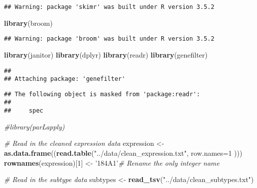 \documentclass[]{article}
\newenvironment{Shaded}{\begin{snugshade}}{\end{snugshade}}
\newcommand{\KeywordTok}[1]{\textcolor[rgb]{0.13,0.29,0.53}{\textbf{#1}}}
\newcommand{\DataTypeTok}[1]{\textcolor[rgb]{0.13,0.29,0.53}{#1}}
\newcommand{\DecValTok}[1]{\textcolor[rgb]{0.00,0.00,0.81}{#1}}
\newcommand{\StringTok}[1]{\textcolor[rgb]{0.31,0.60,0.02}{#1}}
\newcommand{\CommentTok}[1]{\textcolor[rgb]{0.56,0.35,0.01}{\textit{#1}}}
\newcommand{\NormalTok}[1]{#1}
\begin{document}
\begin{verbatim}
## Warning: package 'skimr' was built under R version 3.5.2
\end{verbatim}

\begin{Shaded}
\begin{Highlighting}[]
\KeywordTok{library}\NormalTok{(broom)}
\end{Highlighting}
\end{Shaded}

\begin{verbatim}
## Warning: package 'broom' was built under R version 3.5.2
\end{verbatim}

\begin{Shaded}
\begin{Highlighting}[]
\KeywordTok{library}\NormalTok{(janitor)}
\KeywordTok{library}\NormalTok{(dplyr)}
\KeywordTok{library}\NormalTok{(readr)}
\KeywordTok{library}\NormalTok{(genefilter)}
\end{Highlighting}
\end{Shaded}

\begin{verbatim}
## 
## Attaching package: 'genefilter'
\end{verbatim}

\begin{verbatim}
## The following object is masked from 'package:readr':
## 
##     spec
\end{verbatim}

\begin{Shaded}
\begin{Highlighting}[]
\CommentTok{#library(parLapply)}
\end{Highlighting}
\end{Shaded}

\begin{Shaded}
\begin{Highlighting}[]
\CommentTok{# Read in the cleaned expression data}
\NormalTok{expression <-}\StringTok{ }\KeywordTok{as.data.frame}\NormalTok{((}\KeywordTok{read.table}\NormalTok{(}\StringTok{"../data/clean_expression.txt"}\NormalTok{, }\DataTypeTok{row.names=}\DecValTok{1}\NormalTok{ )))}
\KeywordTok{rownames}\NormalTok{(expression)[}\DecValTok{1}\NormalTok{] <-}\StringTok{ '184A1'}\CommentTok{# Rename the only integer name}

\CommentTok{# Read in the subtype data}
\NormalTok{subtypes <-}\StringTok{ }\KeywordTok{read_tsv}\NormalTok{(}\StringTok{"../data/clean_subtypes.txt"}\NormalTok{)}
\end{Highlighting}
\end{Shaded}
\end{document}
